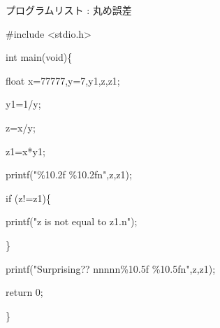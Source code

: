 \documentclass{article}
\begin{document}
\begin{maplegroup}
\begin{Maple Normal}{
プログラムリスト : 丸め誤差}\end{Maple Normal}

\begin{Maple Normal}{
\#include <stdio.h>}\end{Maple Normal}

\begin{Maple Normal}{
}\end{Maple Normal}
\begin{Maple Normal}{
int main(void)\{}\end{Maple Normal}

\begin{Maple Normal}{
float x=77777,y=7,y1,z,z1;}\end{Maple Normal}

\begin{Maple Normal}{
y1=1/y;}\end{Maple Normal}

\begin{Maple Normal}{
z=x/y;}\end{Maple Normal}

\begin{Maple Normal}{
z1=x*y1;}\end{Maple Normal}

\begin{Maple Normal}{
printf("\%10.2f \%10.2fn",z,z1);}\end{Maple Normal}

\begin{Maple Normal}{
if (z!=z1)\{}\end{Maple Normal}

\begin{Maple Normal}{
printf("z is not equal to z1.n");}\end{Maple Normal}

\begin{Maple Normal}{
\}}\end{Maple Normal}

\begin{Maple Normal}{
printf("Surprising?? nnnnn\%10.5f \%10.5fn",z,z1);}\end{Maple Normal}

\begin{Maple Normal}{
return 0;

\}}\end{Maple Normal}
\end{maplegroup}
\end{document}
